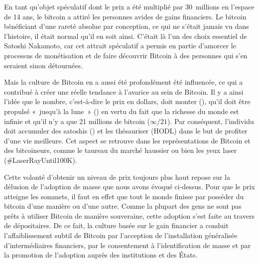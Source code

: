 En tant qu'objet spéculatif dont le prix a été multiplié par 30~millions en l'espace de 14 ans, le bitcoin a attiré les personnes avides de gains financiers. Le bitcoin bénéficiant d'une rareté absolue par conception, ce qui ne s'était jamais vu dans l'histoire, il était normal qu'il en soit ainsi. C'était là l'un des choix essentiel de Satoshi Nakamoto, car cet attrait spéculatif a permis en partie d'amorcer le processus de monétisation et de faire découvrir Bitcoin à des personnes qui s'en seraient sinon détournées.

Mais la culture de Bitcoin en a aussi été profondément été influencée, ce qui a contribué à créer une réelle tendance à l'avarice au sein de Bitcoin. Il y a ainsi l'idée que le nombre, c'est-à-dire le prix en dollars, doit monter (), qu'il doit être propulsé «~jusqu'à la lune~» () en vertu du fait que la richesse du monde est infinie et qu'il n'y a que 21 millions de bitcoin ($\infty / 21$). Par conséquent, l'individu doit accumuler des satoshis () et les thésauriser (HODL) dans le but de profiter d'une vie meilleure. Cet aspect se retrouve dans les représentations de Bitcoin et des bitcoineurs, comme le taureau du marché haussier ou bien les yeux laser (\#LaserRayUntil100K). %

Cette volonté d'obtenir un niveau de prix toujours plus haut repose sur la délusion de l'adoption de masse que nous avons évoqué ci-dessus. Pour que le prix atteigne les sommets, il faut en effet que tout le monde finisse par posséder du bitcoin d'une manière ou d'une autre. Comme la plupart des gens ne sont pas prêts à utiliser Bitcoin de manière souveraine, cette adoption s'est faite au travers de dépositaires. De ce fait, la culture basée sur le gain financier a conduit l'affaiblissement subtil de Bitcoin par l'acception de l'installation généralisée d'intermédiaires financiers, par le consentement à l'identification de masse et par la promotion de l'adoption auprès des institutions et des États. %


